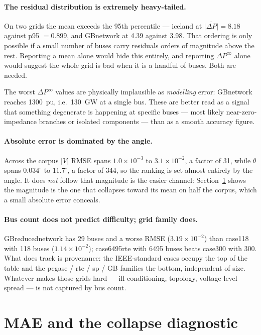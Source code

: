\documentclass[10pt]{article}
\begin{document}
\paragraph{The residual distribution is extremely heavy-tailed.} On two grids
the mean exceeds the 95th percentile --- iceland at
$\overline{|\Delta P|}=8.18$ against p95 $=0.899$, and GBnetwork at 4.39 against
3.98. That ordering is only possible if a small number of buses carry residuals
orders of magnitude above the rest. Reporting a mean alone would hide this
entirely, and reporting $\Delta P^{\infty}$ alone would suggest the whole grid is
bad when it is a handful of buses. Both are needed.

The worst $\Delta P^{\infty}$ values are physically implausible as
\emph{modelling} error: GBnetwork reaches 1300~pu, i.e.\ 130~GW at a single bus.
These are better read as a signal that something degenerate is happening at
specific buses --- most likely near-zero-impedance branches or isolated
components --- than as a smooth accuracy figure.

\paragraph{Absolute error is dominated by the angle.} Across the corpus
$|V|$ RMSE spans $1.0\times10^{-3}$ to $3.1\times10^{-2}$, a factor of 31, while
$\theta$ spans $0.034^\circ$ to $11.7^\circ$, a factor of 344, so the ranking is
set almost entirely by the angle. It does \emph{not} follow that magnitude is
the easier channel: Section~\ref{sec:diag} shows the magnitude is the one that
collapses toward its mean on half the corpus, which a small absolute error
conceals.

\paragraph{Bus count does not predict difficulty; grid family does.}
GBreducednetwork has 29 buses and a worse RMSE ($3.19\times10^{-2}$) than
case118 with 118 buses ($1.14\times10^{-2}$); case6495rte with 6495 buses beats
case300 with 300. What does track is provenance: the IEEE-standard cases occupy
the top of the table and the pegase / rte / sp / GB families the bottom,
independent of size. Whatever makes those grids hard --- ill-conditioning,
topology, voltage-level spread --- is not captured by bus count.


\section{MAE and the collapse diagnostic}
\label{sec:diag}
\end{document}
